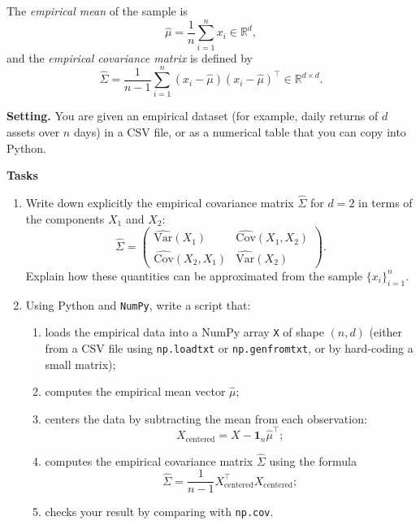 \documentclass[11pt]{article}
\begin{document}
\medskip

The \emph{empirical mean} of the sample is
\[
\hat \mu = \frac{1}{n} \sum_{i=1}^n x_i \in \mathbb{R}^d,
\]
and the \emph{empirical covariance matrix} is defined by
\[
\widehat{\Sigma} 
= \frac{1}{n-1} \sum_{i=1}^n (x_i - \hat \mu)(x_i - \hat \mu)^\top 
\in \mathbb{R}^{d \times d}.
\]

\medskip

\noindent
\textbf{Setting.}  
You are given an empirical dataset (for example, daily returns of $d$ assets over $n$ days) in a CSV file, or as a numerical table that you can copy into Python.

\medskip

\noindent
\textbf{Tasks}

\begin{enumerate}
    \item Write down explicitly the empirical covariance matrix $\widehat{\Sigma}$ for $d=2$ in terms of the components $X_1$ and $X_2$:
    \[
      \widehat{\Sigma} = 
      \begin{pmatrix}
      \widehat{\mathrm{Var}}(X_1) & \widehat{\mathrm{Cov}}(X_1,X_2) \\
      \widehat{\mathrm{Cov}}(X_2,X_1) & \widehat{\mathrm{Var}}(X_2)
      \end{pmatrix}.
    \]
    Explain how these quantities can be approximated from the sample $\{x_i\}_{i=1}^n$.
    
    \item Using Python and \texttt{NumPy}, write a script that:
    \begin{enumerate}
        \item loads the empirical data into a NumPy array \texttt{X} of shape $(n,d)$ (either from a CSV file using \texttt{np.loadtxt} or \texttt{np.genfromtxt}, or by hard-coding a small matrix);
        \item computes the empirical mean vector $\hat \mu$;
        \item centers the data by subtracting the mean from each observation:
        \[
        X_{\text{centered}} = X - \mathbf{1}_n \hat \mu^\top;
        \]
        \item computes the empirical covariance matrix $\widehat{\Sigma}$ using the formula
        \[
        \widehat{\Sigma} 
        = \frac{1}{n-1} X_{\text{centered}}^\top X_{\text{centered}};
        \]
        \item checks your result by comparing with \texttt{np.cov}.
    \end{enumerate}
    

\end{enumerate}
\end{document}
